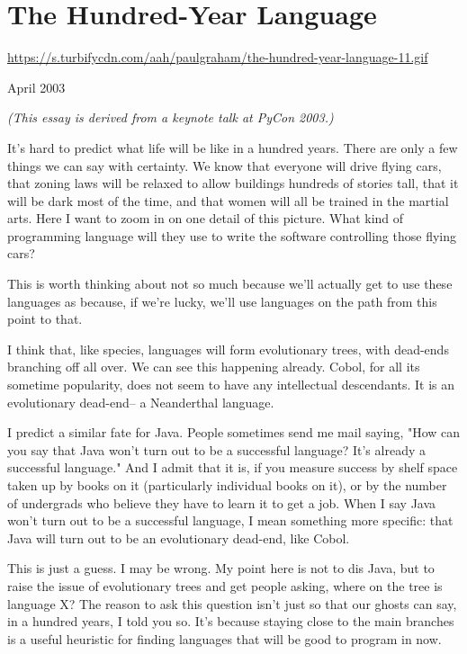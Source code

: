 \chapter{The Hundred-Year Language}

\href{https://s.turbifycdn.com/aah/paulgraham/the-hundred-year-language-11.gif}{https://s.turbifycdn.com/aah/paulgraham/the-hundred-year-language-11.gif}



April 2003

\emph{(This essay is derived from a keynote talk at PyCon 2003.)}

It's hard to predict what
life will be like in a hundred years.  There are only a few
things we can say with certainty.  We know that everyone will
drive flying cars,
that zoning laws will be relaxed to allow buildings
hundreds of stories tall, that it will be dark most of the
time, and that women will all be trained in the martial arts.  
Here I want to zoom in on one detail of this
picture.  What kind of programming language will they use to
write the software controlling those flying cars?

This is worth thinking about not so
much because we'll actually get to use these languages as because,
if we're lucky, we'll use languages on the path from this
point to that.



I think that, like species, languages will form evolutionary trees,
with dead-ends branching off all over.  We can see this
happening already.
Cobol, for all its sometime popularity, does not seem to have any
intellectual descendants.  It is an evolutionary dead-end-- a
Neanderthal language.

I predict a similar fate for Java.  People
sometimes send me mail saying, "How can you say that Java
won't turn out to be a successful language?  It's already
a successful language."  And I admit that it is, if you
measure success by shelf space taken up by books on it
(particularly individual books on it), or by
the number of undergrads who believe they have to
learn it to get a job.  When I say Java won't
turn out to be a successful language, I mean something more
specific:  that Java
will turn out to be an evolutionary dead-end, like Cobol.

This is just a guess.  I may be wrong.  My point here is not to dis Java,
but to raise the issue of evolutionary
trees and get people asking, where on the tree is language X?
The reason to ask this question isn't just so that
our ghosts can say, in a
hundred years, I told you so.  It's because staying close to  
the main branches is a useful heuristic for finding languages that will
be good to program in now.

